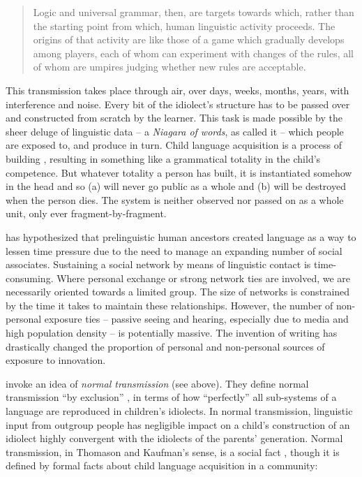 \begin{quotation}
Logic and universal grammar, then, are targets towards which, rather than the starting point from which, human linguistic activity proceeds. The origins of that activity are like those of a game which gradually develops among players, each of whom can experiment with changes of the rules, all of whom are umpires judging whether new rules are acceptable. \citep[197]{le_page_acts_1985} 
\end{quotation}

This transmission takes place through air, over days, weeks, months, years, with interference and noise. Every bit of the idiolect's structure has to be passed over and constructed from scratch by the learner. This task is made possible by the sheer deluge of linguistic data -- a \textit{Niagara of words}, as \citet[12]{hayakawa_language_1978} called it -- which people are exposed to, and produce in turn. Child language acquisition is a process of building \citep{tomasello_constructing_2003}, resulting in something like a grammatical totality in the child's competence. But whatever totality a person has built, it is instantiated somehow in the head and so (a) will never go public as a whole and (b) will be destroyed when the person dies. The system is neither observed nor passed on as a whole unit, only ever fragment-by-fragment.

\citet{dunbar_grooming_1996} has hypothesized that prelinguistic human ancestors created language as a way to lessen time pressure due to the need to manage an expanding number of social associates. Sustaining a social network by means of linguistic contact is time-consuming. Where personal exchange or strong network ties are involved, we are necessarily oriented towards a limited group. The size of networks is constrained by the time it takes to maintain these relationships. However, the number of non-personal exposure ties -- passive seeing and hearing, especially due to media and high population density -- is potentially massive. The invention of writing has drastically changed the proportion of personal and non-personal sources of exposure to innovation.

\citet{thomason_language_1988} invoke an idea of \textit{normal transmission} (see above). They define normal transmission ``by exclusion'' \citep[10]{thomason_language_1988}, in terms of how ``perfectly'' all sub-systems of a language are reproduced in children's idiolects. In normal transmission, linguistic input from outgroup people has negligible impact on a child's construction of an idiolect highly convergent with the idiolects of the parents' generation. 
Normal transmission, in Thomason and Kaufman's sense, is a social fact \citep[12]{thomason_language_1988}, though it is defined by formal facts about child language acquisition in a community:


